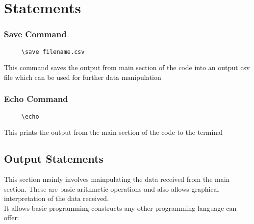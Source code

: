 \chapter{Statements}\label{ch:stmt}

\subsection{Save Command}
\begin{lstlisting}
     \save filename.csv
\end{lstlisting}
This command saves the output from main section of the code into an output csv file which can be used for further data manipulation

\subsection{Echo Command}
\begin{lstlisting}
     \echo
\end{lstlisting}
This prints the output from the main section of the code to the terminal

\section{Output Statements}
This section mainly involves mainpulating the data received from the main section. These are basic arithmetic operations and also allows graphical interpretation of the data received.\\
It allows basic programming constructs any other programming language can offer:

